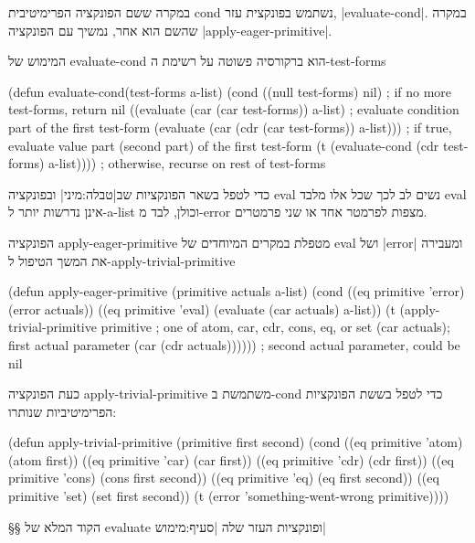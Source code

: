 במקרה ששם הפונקציה הפרימיטיבית cond נשתמש בפונקצית עזר, \E|evaluate-cond|. במקרה
שהשם הוא אחר, נמשיך עם הפונקציה \E|apply-eager-primitive|.

המימוש של evaluate-cond הוא ברקורסיה פשוטה על רשימת ה-test-forms
\begin{KERNEL}
(defun evaluate-cond(test-forms a-list)
  (cond ((null test-forms) nil) ; if no more test-forms, return nil
        ((evaluate (car (car test-forms)) a-list) ; evaluate condition part of the first test-form
        (evaluate (car (cdr (car test-forms)) a-list))) ; if true, evaluate value part (second part) of the first test-form
        (t (evaluate-cond (cdr test-forms) a-list)))) ; otherwise, recurse on rest of test-forms
\end{KERNEL}

כדי לטפל בשאר הפונקציות שב|טבלה:מיני| ובפונקציה eval נשים לב לכך שכל אלו
מלבד eval אינן נדרשות יותר ל-a-list וכולן, לבד מ-error מצפות לפרמטר אחד או שני פרמטרים.

הפונקציה apply-eager-primitive מטפלת במקרים המיוחדים של eval ושל \E|error|
ומעבירה את המשך הטיפול ל-apply-trivial-primitive
\begin{KERNEL}
(defun apply-eager-primitive (primitive actuals a-list)
  (cond ((eq primitive 'error) (error actuals))
        ((eq primitive 'eval) (evaluate (car actuals) a-list))
        (t (apply-trivial-primitive
              primitive ; one of atom, car, cdr, cons, eq, or set
              (car actuals); first actual parameter
              (car (cdr actuals)))))) ; second actual parameter, could be nil
\end{KERNEL}

כעת הפונקציה apply-trivial-primitive משתמשת ב-cond כדי לטפל בששת הפונקציות הפרימיטיביות שנותרו:
\begin{KERNEL}
(defun apply-trivial-primitive (primitive first second)
  (cond ((eq primitive 'atom) (atom first))
        ((eq primitive 'car) (car first))
        ((eq primitive 'cdr) (cdr first))
        ((eq primitive 'cons) (cons first second))
        ((eq primitive 'eq) (eq first second))
        ((eq primitive 'set) (set first second))
        (t (error 'something-went-wrong primitive))))
\end{KERNEL}

§§ הקוד המלא של evaluate ופונקציות העזר שלה
|סעיף:מימוש|

\immediate\closeout \libraryFile
\immediate\closeout {}

\begin{LTR}
  
\end{LTR}


